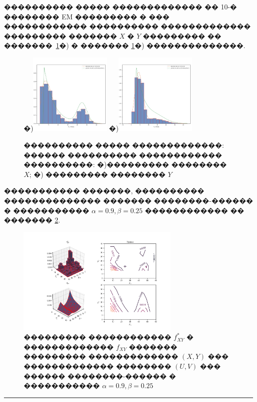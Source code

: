 \documentclass[11pt]{ubs}
\begin{document}
\begin{example}
  ����������  ����� �������������  �� 10-� �������� EM ��������� � ��� ������������ ����������  ������������� ��������� ������� $X$  � $Y$ ��������� �� �������~\ref{fig:margin}�) � ������� \ref{fig:margin}�) ��������������.
  \begin{figure}[tbph]
    \centering
    �)\includegraphics[width = 0.35\textwidth, trim={0 1cm 0 3.2cm}, clip]{EM_yad_oc_dens1.png}
    �)\includegraphics[width = 0.35\textwidth, trim={0 1cm 0 3.2cm}, clip]{EM_yad_oc_dens2.png}
    \caption{���������� ����� �������������: ������ ���������� ������������ ����������: �)��������� �������� $X$; �) ��������� �������� $Y$}\label{fig:margin}
  \end{figure}
  \newpage

  ����������� �������, ���������� �������������� ������� ��������-������ � ����������� \(\alpha=0.9, \beta=0.25\) ������������ �� ������� \ref{fig:revive_distrib}.

  \begin{figure}[tbph]
    \centering
    \includegraphics[width = 0.7\textwidth, trim={5.5cm 1cm 2cm 2cm}, clip]{EM_revive_density_function.png}
    \caption{��������� ������������  $f_{XY}^{*}$  � ������������� $f_{XY}$ ������� ��������� ������������� $(X,Y)$ ��� ������������� �������� $(U, V)$ ���  ������ ��������-������ � �����������  $\alpha=0.9, \beta=0.25$ }\label{fig:revive_distrib}
  \end{figure}
  
\noindent
\rule{0.95\textwidth}{0em}
\end{example}
\end{document}
